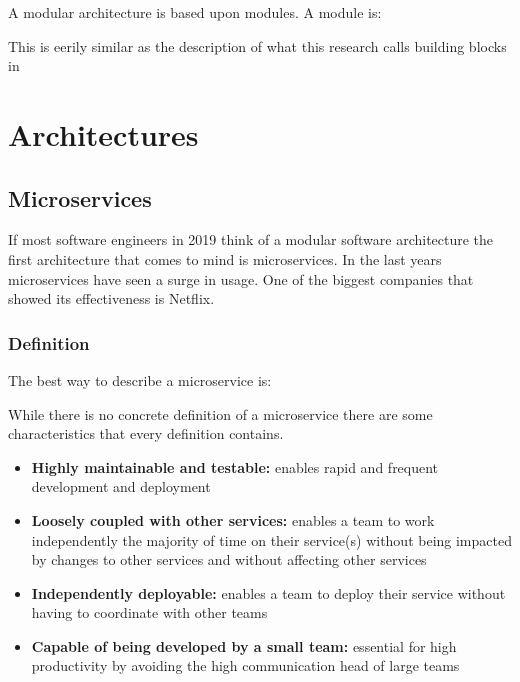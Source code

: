 A modular architecture is based upon modules. A module is:

This is eerily similar as the description of what this research calls building blocks in 

\section{Architectures}
\label{sec:Architectures}

\subsection{Microservices}
If most software engineers in 2019 think of a modular software architecture the first architecture that comes to mind is microservices. In the last years microservices have seen a surge in usage. One of the biggest companies that showed its effectiveness is Netflix.

\subsubsection{Definition}
The best way to describe a microservice is:

While there is no concrete definition of a microservice there are some characteristics that
every definition contains.
\begin{itemize}
        \item \textbf{Highly maintainable and testable:} enables rapid and frequent development and deployment

        \item \textbf{Loosely coupled with other services:} enables a team to work independently the majority of time on their service(s) without being impacted by changes to other services and without affecting other services

        \item \textbf{Independently deployable:} enables a team to deploy their service without having to coordinate with other teams

        \item \textbf{Capable of being developed by a small team:} essential for high productivity by avoiding the high communication head of large teams \cite{microservicesCharactaristics}
\end{itemize}

